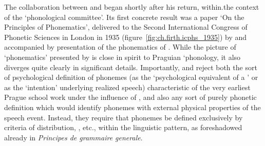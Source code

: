 The collaboration between {\Hjelmslev} and {\Uldall} began shortly after his
return, within.the context of the `phonological committee'. Its first
concrete result was a paper \citep{hjelmslev.uldall35:phonematics} `On
the Principles of Phonematics', delivered to the Second International
Congress of Phonetic Sciences in London in 1935
(figure~\ref{fig:ch.firth.icphs_1935}) by {\Hjelmslev} and accompanied by
 presentation of the phonematics of
. While the picture of `phonematics' presented by {\Hjelmslev} is
close in spirit to Praguian `phonology, it also diverges quite clearly
in significant details. Importantly, {\Hjelmslev} and {\Uldall} reject both
the sort of psychological definition of phonemes (as the
`psychological equivalent of a ' or as the `intention'
underlying realized speech) characteristic of the very earliest Prague
school work under the influence of {\DeCourtenay}, and also any
sort of purely phonetic definition which would identify phonemes with
external physical properties of the speech event. Instead, they
require that phonemes be defined exclusively by criteria of
distribution, , etc., within the linguistic pattern, as
foreshadowed already in 
\textsl{Principes de grammaire generale}.

